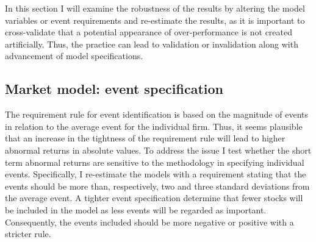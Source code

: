 

In this section I will examine the robustness of the results by altering the model variables or event requirements and re-estimate the results, as it is important to cross-validate that a potential appearance of over-performance is not created artificially. Thus, the practice can lead to validation or invalidation along with advancement of model specifications. 

\subsection{Market model: event specification}
The requirement rule for event identification is based on the magnitude of events in relation to the average event for the individual firm. Thus, it seems plausible that an increase in the tightness of the requirement rule will lead to higher abnormal returns in absolute values.  
To address the issue I test whether the short term abnormal returns are sensitive to the methodology in specifying individual events. Specifically, I re-estimate the models with a requirement stating that the events should be more than, respectively, two and three standard deviations from the average event. A tighter event specification determine that fewer stocks will be included in the model as less events will be regarded as important. Consequently, the events included should be more negative or positive with a stricter rule. 


